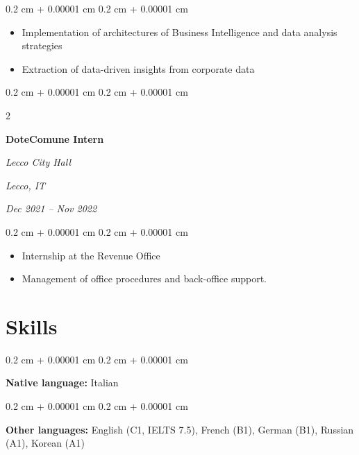 \documentclass[10pt, letterpaper]{article}
\newenvironment{highlights}{
    \begin{itemize}[
        topsep=0.10 cm,
        parsep=0.10 cm,
        partopsep=0pt,
        itemsep=0pt,
        leftmargin=0.4 cm + 10pt
    ]
}{
    \end{itemize}
} %
\newenvironment{onecolentry}{
    \begin{adjustwidth}{
        0.2 cm + 0.00001 cm
    }{
        0.2 cm + 0.00001 cm
    }
}{
    \end{adjustwidth}
} %
\newenvironment{twocolentry}[2][]{
    \onecolentry
    \def\secondColumn{#2}
    \setcolumnwidth{\fill, 4.5 cm}
    \begin{paracol}{2}
}{
    \switchcolumn \raggedleft \secondColumn
    \end{paracol}
    \endonecolentry
} %
\begin{document}
        \vspace{0.10 cm}
        \begin{onecolentry}
            \begin{highlights}
                \item Implementation of architectures of Business Intelligence and data analysis strategies 
                \item Extraction of data-driven insights from corporate data
            \end{highlights}
        \end{onecolentry}

        \vspace{0.2 cm}

\begin{twocolentry}{
        \textit{Lecco, IT}    
            
        \textit{Dec 2021 – Nov 2022}}
            \textbf{DoteComune Intern}
            
            \textit{Lecco City Hall}
        \end{twocolentry}

        \vspace{0.10 cm}
        \begin{onecolentry}
            \begin{highlights}
                \item Internship at the Revenue Office
                \item Management of office procedures and back-office support.
            \end{highlights}
        \end{onecolentry}

    \section{Skills}       
        \begin{onecolentry}
            \textbf{Native language:} Italian           
            
        \end{onecolentry}

        \vspace{0.1 cm}

        \begin{onecolentry}
            \textbf{Other languages:} English (C1, IELTS 7.5), French (B1), German (B1), Russian (A1), Korean (A1)
        \end{onecolentry}
                \vspace{0.1 cm}
\end{document}

